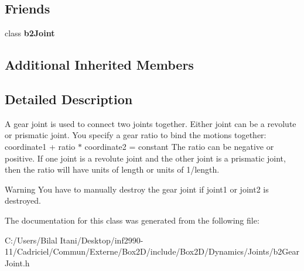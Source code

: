 \subsection*{Friends}
\begin{DoxyCompactItemize}
\item 
class {\bfseries b2\+Joint}\hypertarget{classb2_gear_joint_a54ade8ed3d794298108d7f4c4e4793fa}{}\label{classb2_gear_joint_a54ade8ed3d794298108d7f4c4e4793fa}

\end{DoxyCompactItemize}
\subsection*{Additional Inherited Members}


\subsection{Detailed Description}
A gear joint is used to connect two joints together. Either joint can be a revolute or prismatic joint. You specify a gear ratio to bind the motions together\+: coordinate1 + ratio $\ast$ coordinate2 = constant The ratio can be negative or positive. If one joint is a revolute joint and the other joint is a prismatic joint, then the ratio will have units of length or units of 1/length. \begin{DoxyWarning}{Warning}
You have to manually destroy the gear joint if joint1 or joint2 is destroyed. 
\end{DoxyWarning}


The documentation for this class was generated from the following file\+:\begin{DoxyCompactItemize}
\item 
C\+:/\+Users/\+Bilal Itani/\+Desktop/inf2990-\/11/\+Cadriciel/\+Commun/\+Externe/\+Box2\+D/include/\+Box2\+D/\+Dynamics/\+Joints/b2\+Gear\+Joint.\+h\end{DoxyCompactItemize}
